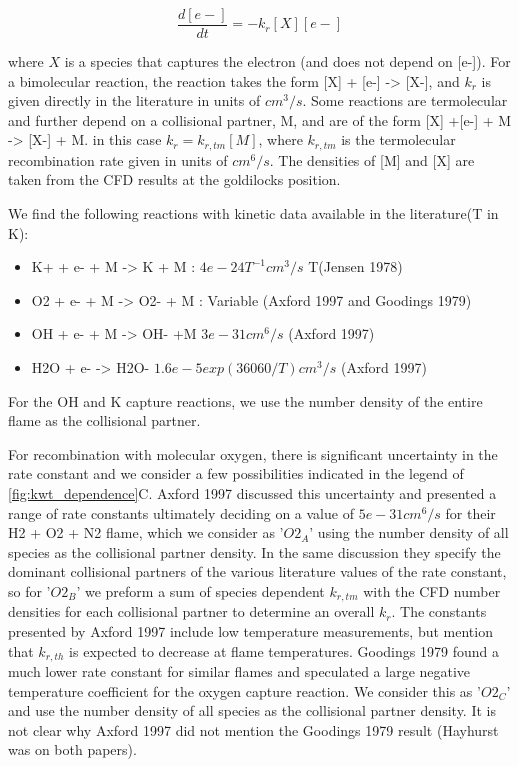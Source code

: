\begin{equation}
    \frac{d[e-]}{dt} = - k_r [X][e-]
\end{equation}

where $X$ is a species that captures the electron (and does not depend on [e-]). For a bimolecular reaction, the reaction takes the form [X] + [e-] -> [X-], and $k_r$ is given directly in the literature in units of $cm^3/s$. Some reactions are termolecular and further depend on a collisional partner, M, and are of the form [X] +[e-] + M -> [X-] + M. in this case $k_r = k_{r,tm} [M]$, where $k_{r,tm}$ is the termolecular recombination rate given in units of $cm^6/s$.  The densities of [M] and [X] are taken from the CFD results at the goldilocks position.

We find the following reactions with kinetic data available in the literature(T in K):

\begin{itemize}
    \item K+ + e- + M -> K + M : $4e-24 T^{-1} cm^3/s$ T(Jensen 1978) 
    \item O2 + e- + M -> O2- + M : Variable (Axford 1997 and Goodings 1979)
    \item OH + e- + M -> OH- +M  $3e-31 cm^6/s$ (Axford 1997)
    \item H2O + e- -> H2O- $1.6e-5 exp(36060/T) cm^3/s$ (Axford 1997)
\end{itemize}

For the OH and K capture reactions, we use the number density of the entire flame as the collisional partner. 

For recombination with molecular oxygen, there is significant uncertainty in the rate constant and we consider a few possibilities indicated in the legend of \ref{fig:kwt_dependence}C. Axford 1997 discussed this uncertainty and presented a range of rate constants ultimately deciding on a value of $5e-31 cm^6/s$ for their H2 + O2 + N2 flame, which we consider as '$O2_A$' using the number density of all species as the collisional partner density. In the same discussion they specify the dominant collisional partners of the various literature values of the rate constant, so for '$O2_B$' we preform a sum of species dependent $k_{r,tm}$ with the CFD number densities for each collisional partner to determine an overall $k_r$. The constants presented by Axford 1997 include low temperature measurements, but mention that $k_{r,th}$ is expected to decrease at flame temperatures. Goodings 1979 found a much lower rate constant for similar flames and speculated a large negative temperature coefficient for the oxygen capture reaction. We consider this as '$O2_C$' and use the number density of all species as the collisional partner density. It is not clear why Axford 1997 did not mention the Goodings 1979 result (Hayhurst was on both papers). 

